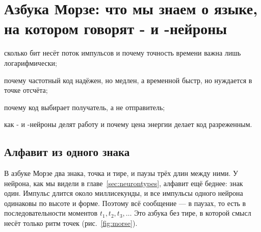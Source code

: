\chapter{Азбука Морзе: что мы знаем о языке, на котором говорят - и -нейроны}
\label{sec:code}
\begin{chaptergoals}
\item сколько бит несёт поток импульсов и почему точность времени важна лишь логарифмически;
\item почему частотный код надёжен, но медлен, а временной быстр, но нуждается в точке отсчёта;
\item почему код выбирает получатель, а не отправитель;
\item как - и -нейроны делят работу и почему цена энергии делает код разреженным.
\end{chaptergoals}

\section{Алфавит из одного знака}

В азбуке Морзе два знака, точка и тире, и паузы трёх длин между ними. У нейрона, как мы видели в главе~\ref{sec:neurontypes}, алфавит ещё беднее: знак один. Импульс длится около миллисекунды, и все импульсы одного нейрона одинаковы по высоте и форме. Поэтому всё сообщение --- в паузах, то есть в последовательности моментов $t_1,t_2,t_3,\dots$ Это азбука без тире, в которой смысл несёт только ритм точек (рис.~\ref{fig:morse}).

